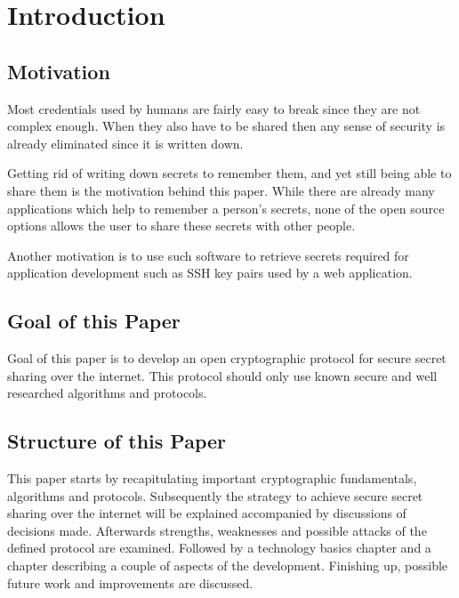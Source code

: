 \chapter{Introduction}
\label{cha:Introduction}

\section{Motivation}
\label{sec:Motivation}

Most credentials used by humans are fairly easy to break since they are not
complex enough. When they also have to be shared then any sense of security is
already eliminated since it is written down.

Getting rid of writing down secrets to remember them, and yet still being able
to share them is the motivation behind this paper. While there are already many
applications which help to remember a person's secrets, none of the open source
options allows the user to share these secrets with other people.

Another motivation is to use such software to retrieve secrets required for
application development such as SSH key pairs used by a web application.

\section{Goal of this Paper}
\label{sec:GoalOfThisPaper}

Goal of this paper is to develop an open cryptographic protocol for secure
secret sharing over the internet. This protocol should only use known secure
and well researched algorithms and protocols.

\section{Structure of this Paper}
\label{sec:StructureOfThisPaper}

This paper starts by recapitulating important cryptographic fundamentals,
algorithms and protocols. Subsequently the strategy to achieve secure secret
sharing over the internet will be explained accompanied by discussions of
decisions made. Afterwards strengths, weaknesses and possible attacks of the
defined protocol are examined. Followed by a technology basics chapter and a
chapter describing a couple of aspects of the development. Finishing up,
possible future work and improvements are discussed.
